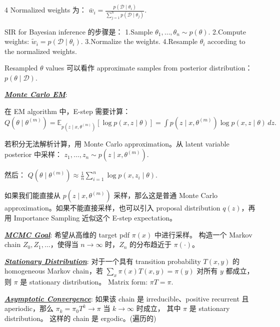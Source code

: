 \documentclass[12pt]{article}
\newcommand{\bulletPoint}[1]{\underline{\textit{\textbf{#1}}}}
\begin{document}
\begin{multicols*}{4}
Normalized weights 为：
$
\bar w_i
=
\frac{
p(\mathcal D\mid \theta_i)
}{
\sum_{j=1}^n p(\mathcal D\mid \theta_j)
}.
$

SIR for Bayesian inference 的步骤是：
1.Sample $\theta_1,\dots,\theta_n\sim p(\theta)$.
2.Compute weights: $\tilde w_i=p(\mathcal D\mid \theta_i)$.
3.Normalize the weights.
4.Resample $\theta_i$ according to the normalized weights.


Resampled $\theta$ values 可以看作 approximate samples from posterior distribution：
$
p(\theta\mid \mathcal D).
$


\bulletPoint{Monte Carlo EM}:

在 EM algorithm 中，E-step 需要计算：
$
Q(\theta\mid \theta^{(m)})
=
\mathbb E_{p(z\mid x,\theta^{(m)})}
\left[
\log p(x,z\mid \theta)
\right]
=
\int
p(z\mid x,\theta^{(m)})
\log p(x,z\mid \theta)
\,dz.
$

若积分无法解析计算，用 Monte Carlo approximation。从 latent variable posterior 中采样：
$
z_1,\dots,z_n
\sim
p(z\mid x,\theta^{(m)}).
$

然后：
$
Q(\theta\mid \theta^{(m)})
\approx
\frac{1}{n}
\sum_{i=1}^n
\log p(x,z_i\mid \theta).
$

如果我们能直接从
$
p(z\mid x,\theta^{(m)})
$
采样，那么这是普通 Monte Carlo approximation。如果不能直接采样，也可以引入 proposal distribution $q(z)$，再用 Importance Sampling 近似这个 E-step expectation。





\bulletPoint{MCMC Goal}:
希望从高维的 target pdf $\pi(x)$ 中进行采样。
构造一个 Markov chain $Z_0,Z_1,\dots$，使得当 $n\to\infty$ 时，$Z_n$ 的分布趋近于 $\pi(\cdot)$。

\bulletPoint{Stationary Distribution}:
对于一个具有 transition probability $T(x,y)$ 的 homogeneous Markov chain，若
$\sum_x \pi(x)T(x,y)=\pi(y)$ 对所有 $y$ 都成立，则 $\pi$ 是 stationary distribution。
Matrix form:
$\pi T=\pi.$


\bulletPoint{Asymptotic Convergence}:
如果该 chain 是 irreducible、positive recurrent 且 aperiodic，那么
$\pi_k=\pi_0T^k \to \pi$
当 $k\to\infty$ 时成立，
其中 $\pi$ 是 stationary distribution。
这样的 chain 是 ergodic。(遍历的)


\end{multicols*}
\end{document}
